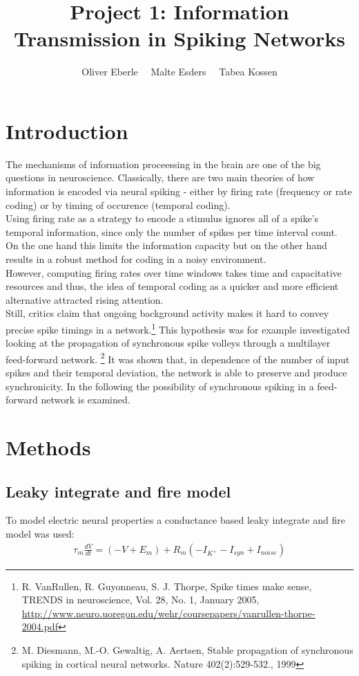 \documentclass[12pt,a4paper, bibliography=totoc, listof=numbered, footexclude]{scrartcl}
\begin{document}
 \title{Project 1: Information Transmission in Spiking Networks}
 \author{Oliver Eberle \ \  Malte Esders \ \ Tabea Kossen}
 \maketitle 
   \thispagestyle{empty}
 \newpage
 \section{Introduction}
 The mechanisms of information proceessing in the brain are one of the big questions in neuroscience. Classically, there are two main theories of how information is encoded via neural spiking - either by firing rate (frequency or rate coding) or by timing of occurence (temporal coding).\\
 Using  firing rate as a strategy to encode a stimulus ignores all of a spike's temporal information, since only the number of spikes per time interval count. On the one hand this limits the information capacity but on the other hand results in a robust method for coding in a noisy environment.\\
 However, computing firing rates over time windows takes time and capacitative resources and thus, the idea of temporal coding as a quicker and more efficient alternative attracted rising attention.\\
 Still, critics claim that ongoing background activity makes it hard to convey precise spike timings in a network.\footnote{R. 
 VanRullen, R. Guyonneau, S. J.  Thorpe, Spike times make sense, TRENDS in neuroscience, Vol. 28, No. 1, January 2005, \url{http://www.neuro.uoregon.edu/wehr/coursepapers/vanrullen-thorpe-2004.pdf}} This hypothesis was for example investigated looking at the  propagation of synchronous spike volleys through a multilayer feed-forward network. \footnote{M. Diesmann, M.-O. Gewaltig, A. Aertsen, Stable
 propagation of synchronous spiking in cortical neural networks. Nature
 402(2):529-532., 1999} It was shown that, in dependence of the number of input spikes and their temporal deviation, the network is able to preserve and produce synchronicity. In the following the possibility of synchronous spiking in a feed-forward network is examined.
 
  
 \section{Methods}
 \subsection{Leaky integrate and fire model}
 To model electric neural properties a conductance based leaky integrate and fire model was used:
 \begin{align}
 \tau_m\frac{dV}{dt}= (-V + E_m) + R_m (- I_{K^+} - I_{syn} + I_{noise})
 \end{align}
 
\end{document}
